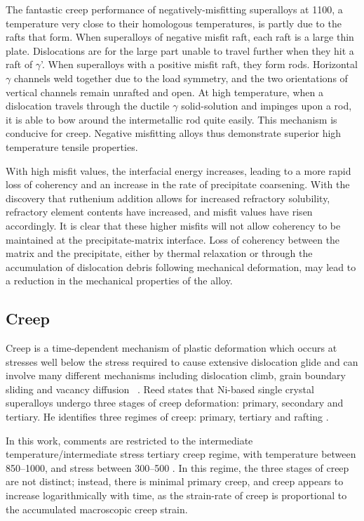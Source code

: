 The fantastic creep performance of negatively-misfitting superalloys at 1100\celsius, a temperature very close to their homologous temperatures, is partly due to the rafts that form.  When superalloys of negative misfit raft, each raft is a large thin plate.  Dislocations are for the large part unable to travel further when they hit a raft of $\gamma$'.  When superalloys with a positive misfit raft, they form rods. Horizontal $\gamma$ channels weld together due to the load symmetry, and the two orientations of vertical channels remain unrafted and open.  At high temperature, when a dislocation travels through the ductile $\gamma$ solid-solution and impinges upon a rod, it is able to bow around the intermetallic rod quite easily.  This mechanism is conducive for creep.  Negative misfitting alloys thus demonstrate superior high temperature tensile properties.

With high misfit values, the interfacial energy increases, leading to a more rapid loss of coherency and an increase in the rate of precipitate coarsening.  With the discovery that ruthenium addition allows for increased refractory solubility, refractory element contents have increased, and misfit values have risen accordingly.  It is clear that these higher misfits will not allow coherency to be maintained at the precipitate-matrix interface.  Loss of coherency between the matrix and the precipitate, either by thermal relaxation or through the accumulation of dislocation debris following mechanical deformation, may lead to a reduction in the mechanical properties of the alloy.



\subsection{Creep}

Creep is a time-dependent mechanism of plastic deformation which occurs at stresses well below the stress required to cause extensive dislocation glide and can involve many different mechanisms including dislocation climb, grain boundary sliding and vacancy diffusion ~\cite{nabarro96}.  Reed states that Ni-based single crystal superalloys undergo three stages of creep deformation: primary, secondary and tertiary.  He identifies three regimes of creep: primary, tertiary and rafting \cite{reed99}. 

In this work, comments are restricted to the intermediate temperature/intermediate stress tertiary creep regime, with temperature between 850--1000\celsius, and stress between 300--500  \mega\pascal.  In this regime, the three stages of creep are not distinct; instead, there is minimal primary creep, and creep appears to increase logarithmically with time, as the strain-rate of creep is proportional to the accumulated macroscopic creep strain.


